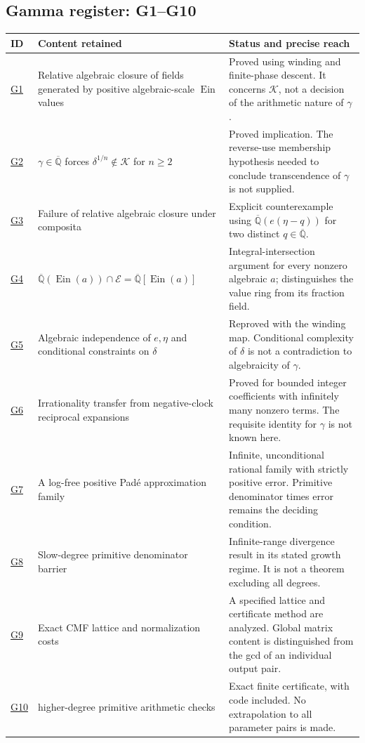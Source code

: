 \documentclass[11pt,a4paper]{article}
\numberwithin{equation}{section}
\theoremstyle{definition}
\theoremstyle{remark}
\newcommand{\A}{\overline{\mathbb Q}}
\newcommand{\Er}{\mathcal E}
\newcommand{\K}{\mathcal K}
\newcommand{\Ein}{\operatorname{Ein}}
\begin{document}
\subsection{Gamma register: G1--G10}
\label{intro:gamma-register}
\small
\begin{longtable}{@{}p{}>{\raggedright\arraybackslash}p{}>{\raggedright\arraybackslash}p{}@{}}
\toprule
ID & Content retained & Status and precise reach\\
\midrule\endhead
\hyperref[gf:jointclosure]{G1} & Relative algebraic closure of fields generated by positive algebraic-scale $\Ein$ values & Proved using winding and finite-phase descent.  It concerns $\K$, not a decision of the arithmetic nature of $\gamma$.\\[6pt]
\hyperref[gf:delta-roots]{G2} & $\gamma\in\A$ forces $\delta^{1/n}\notin\K$ for $n\ge2$ & Proved implication.  The reverse-use membership hypothesis needed to conclude transcendence of $\gamma$ is not supplied.\\[6pt]
\hyperref[gf:compositum]{G3} & Failure of relative algebraic closure under composita & Explicit counterexample using $\A(e(\eta-q))$ for two distinct $q\in\A$.\\[6pt]
\hyperref[gf:einintersection]{G4} & $\A(\Ein(a))\cap\Er=\A[\Ein(a)]$ & Integral-intersection argument for every nonzero algebraic $a$; distinguishes the value ring from its fraction field.\\[6pt]
\hyperref[gf:epair]{G5} & Algebraic independence of $e,\eta$ and conditional constraints on $\delta$ & Reproved with the winding map.  Conditional complexity of $\delta$ is not a contradiction to algebraicity of $\gamma$.\\[6pt]
\hyperref[rs:transfer]{G6} & Irrationality transfer from negative-clock reciprocal expansions & Proved for bounded integer coefficients with infinitely many nonzero terms.  The requisite identity for $\gamma$ is not known here.\\[6pt]
\hyperref[ga:logfree]{G7} & A log-free positive Pad\'e approximation family & Infinite, unconditional rational family with strictly positive error.  Primitive denominator times error remains the deciding condition.\\[6pt]
\hyperref[ga:slow-barrier]{G8} & Slow-degree primitive denominator barrier & Infinite-range divergence result in its stated growth regime.  It is not a theorem excluding all degrees.\\[6pt]
\hyperref[ga:lattice]{G9} & Exact CMF lattice and normalization costs & A specified lattice and certificate method are analyzed.  Global matrix content is distinguished from the gcd of an individual output pair.\\[6pt]
\hyperref[ga:384]{G10} & 384 higher-degree primitive arithmetic checks & Exact finite certificate, with code included.  No extrapolation to all parameter pairs is made.\\
\bottomrule
\end{longtable}
\normalsize
\end{document}
